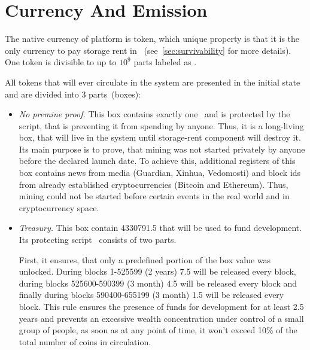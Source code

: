 \section{Currency And Emission}
\label{sec:currency}


The native currency of \Ergo{} platform is \Erg{} token, which unique property is
that it is the only currency to pay storage rent in \Ergo{}~(see~\ref{sec:survivability} for more details).
One \Erg{} token is divisible to up to $10^9$ parts labeled as \nanoErg{}.

All \Erg{} tokens that will ever circulate in the system are presented in
the initial state and are divided into 3 parts~(boxes):

\begin{itemize}
    \item{\em No premine proof.} This box contains exactly one~\Erg{} and is protected by the script,
    that is preventing it from spending by anyone.
    Thus, it is a long-living box, that will live in the system until storage-rent component will
    destroy it.
    Its main purpose is to prove, that \Ergo{} mining was not started privately by anyone before
    the declared launch date.
    To achieve this, additional registers of this box contains news from media (Guardian, Xinhua, Vedomosti)
    and block ids from already established cryptocurrencies (Bitcoin and Ethereum).
    Thus, \Ergo{} mining could not be started before certain events in the real world and in
    cryptocurrency space.

    \item{\em Treasury.} This box contain 4330791.5 \Erg{} that will be used to fund \Ergo{}
    development.
    Its protecting script~\cite{link to corresponding ergo tree} consists of two parts.

    First, it ensures, that only a predefined portion of the box value was unlocked.
    During blocks 1-525599 (2 years) 7.5 \Erg{} will be released every block,
    during blocks 525600-590399 (3 month) 4.5 \Erg{} will be released every block and finally
    during blocks 590400-655199 (3 month) 1.5 \Erg{} will be released every block.
    This rule ensures the presence of funds for \Ergo{} development for at least 2.5 years and
    prevents an excessive wealth concentration under control of a small group of people, as soon
    as at any point of time, it won't exceed 10\% of the total number of coins in circulation.


\end{itemize}
